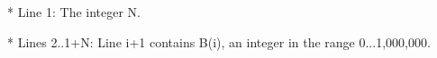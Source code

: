 * Line 1: The integer N. 

* Lines 2..1+N: Line i+1 contains B(i), an integer in the range         0...1,000,000.